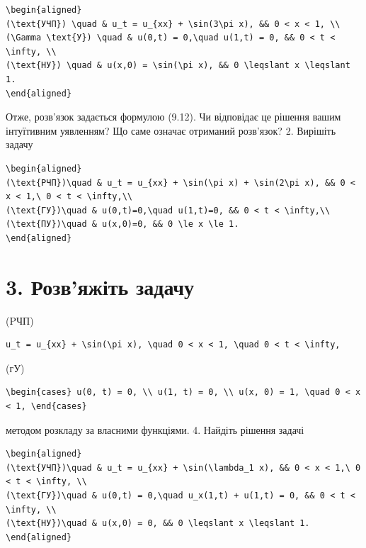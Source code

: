 \documentclass[
  ukrainian,
]{article}
\begin{document}
\begin{verbatim}
\begin{aligned}
(\text{УЧП}) \quad & u_t = u_{xx} + \sin(3\pi x), && 0 < x < 1, \\
(\Gamma \text{У}) \quad & u(0,t) = 0,\quad u(1,t) = 0, && 0 < t < \infty, \\
(\text{НУ}) \quad & u(x,0) = \sin(\pi x), && 0 \leqslant x \leqslant 1.
\end{aligned}
\end{verbatim}

Отже, розв'язок задається формулою (9.12). Чи відповідає це рішення
вашим інтуїтивним уявленням? Що саме означає отриманий розв'язок? 2.
Вирішіть задачу

\begin{verbatim}
\begin{aligned}
(\text{РЧП})\quad & u_t = u_{xx} + \sin(\pi x) + \sin(2\pi x), && 0 < x < 1,\ 0 < t < \infty,\\
(\text{ГУ})\quad & u(0,t)=0,\quad u(1,t)=0, && 0 < t < \infty,\\
(\text{ПУ})\quad & u(x,0)=0, && 0 \le x \le 1.
\end{aligned}
\end{verbatim}

\section{3. Розв'яжіть
задачу}\label{ux440ux43eux437ux432ux44fux436ux456ux442ux44c-ux437ux430ux434ux430ux447ux443}

(PЧП)

\begin{verbatim}
u_t = u_{xx} + \sin(\pi x), \quad 0 < x < 1, \quad 0 < t < \infty,
\end{verbatim}

(гУ)

\begin{verbatim}
\begin{cases} u(0, t) = 0, \\ u(1, t) = 0, \\ u(x, 0) = 1, \quad 0 < x < 1, \end{cases}
\end{verbatim}

методом розкладу за власними функціями. 4. Найдіть рішення задачі

\begin{verbatim}
\begin{aligned}
(\text{УЧП})\quad & u_t = u_{xx} + \sin(\lambda_1 x), && 0 < x < 1,\ 0 < t < \infty, \\
(\text{ГУ})\quad & u(0,t) = 0,\quad u_x(1,t) + u(1,t) = 0, && 0 < t < \infty, \\
(\text{НУ})\quad & u(x,0) = 0, && 0 \leqslant x \leqslant 1.
\end{aligned}
\end{verbatim}
\end{document}
